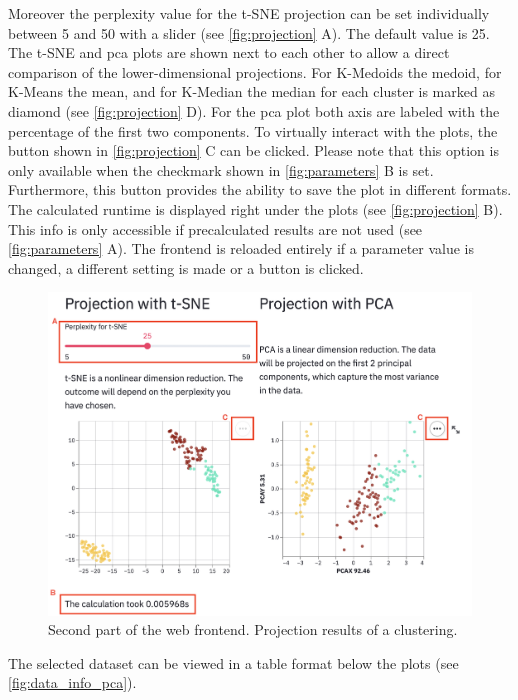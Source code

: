 Moreover the perplexity value for the t-SNE projection can be set individually between 5 and 50 with a slider (see \autoref{fig:projection} A). The default value is 25. The \acrshort{t-SNE} and \acrshort{pca} plots are shown next to each other to allow a direct comparison of the lower-dimensional projections. For K-Medoids the medoid, for K-Means the mean, and for K-Median the median for each cluster is marked as diamond (see \autoref{fig:projection} D). For the \acrshort{pca} plot both axis are labeled with the percentage of the first two components. To virtually interact with the plots, the button shown in \autoref{fig:projection} C can be clicked. Please note that this option is only available when the checkmark shown in \autoref{fig:parameters} B is set. Furthermore, this button provides the ability to save the plot in different formats.
The calculated runtime is displayed right under the plots (see \autoref{fig:projection} B). This info is only accessible if precalculated results are not used (see \autoref{fig:parameters} A).
The frontend is reloaded entirely if a parameter value is changed, a different setting is made or a button is clicked. 
\begin{figure}[H]
	\centering
	\includegraphics[width=\linewidth]{modules/web_frontend/projection_letters}
	\caption{Second part of the web frontend. Projection results of a clustering.}\label{fig:projection}
\end{figure}

The selected dataset can be viewed in a table format below the plots (see \autoref{fig:data_info_pca}).

